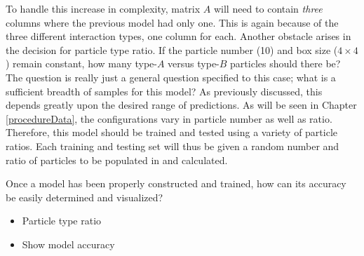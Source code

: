 \par To handle this increase in complexity, matrix $A$ will need to contain \textit{three} columns where the previous model had only one. This is again because of the three different interaction types, one column for each. Another obstacle arises in the decision for particle type ratio. If the particle number (10) and box size ($4\times4$) remain constant, how many type-$A$ versus type-$B$ particles should there be? The question is really just a general question specified to this case; what is a sufficient breadth of samples for this model? As previously discussed, this depends greatly upon the desired range of predictions. As will be seen in Chapter \ref{procedureData}, the configurations vary in particle number as well as ratio. Therefore, this model should be trained and tested using a variety of particle ratios. Each training and testing set will thus be given a random number and ratio of particles to be populated in and calculated. 
\par Once a model has been properly constructed and trained, how can its accuracy be easily determined and visualized?


\begin{itemize}
\item Particle type ratio
\item Show model accuracy
\end{itemize}



